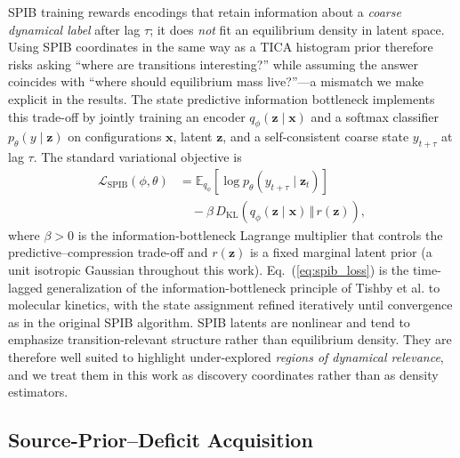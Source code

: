 \documentclass[journal=jctcce,manuscript=article,layout=twocolumn]{achemso}
\begin{document}
SPIB training rewards encodings that retain information about a \emph{coarse dynamical label} after lag $\tau$; it does \emph{not} fit an equilibrium density in latent space. Using SPIB coordinates in the same way as a TICA histogram prior therefore risks asking ``where are transitions interesting?'' while assuming the answer coincides with ``where should equilibrium mass live?''---a mismatch we make explicit in the results. The state predictive information bottleneck\cite{wang2021spib} implements this trade-off by jointly training an encoder $q_\phi(\mathbf{z}\mid\mathbf{x})$ and a softmax classifier $p_\theta(y\mid\mathbf{z})$ on configurations $\mathbf{x}$, latent $\mathbf{z}$, and a self-consistent coarse state $y_{t+\tau}$ at lag $\tau$. The standard variational objective is
\begin{equation}
\begin{split}
    \mathcal{L}_{\mathrm{SPIB}}(\phi,\theta) &=
    \mathbb{E}_{q_\phi}\!\left[\log p_\theta(y_{t+\tau}\mid \mathbf{z}_t)\right] \\
    &\quad - \beta\,D_{\mathrm{KL}}\!\left(q_\phi(\mathbf{z}\mid\mathbf{x})\,\Vert\,r(\mathbf{z})\right),
\end{split}
    \label{eq:spib_loss}
\end{equation}
where $\beta>0$ is the information-bottleneck Lagrange multiplier that controls the predictive--compression trade-off and $r(\mathbf{z})$ is a fixed marginal latent prior (a unit isotropic Gaussian throughout this work). Eq.~(\ref{eq:spib_loss}) is the time-lagged generalization of the information-bottleneck principle of Tishby et al.\cite{tishby2000information} to molecular kinetics, with the state assignment refined iteratively until convergence as in the original SPIB algorithm. SPIB latents are nonlinear and tend to emphasize transition-relevant structure rather than equilibrium density. They are therefore well suited to highlight under-explored \emph{regions of dynamical relevance}, and we treat them in this work as discovery coordinates rather than as density estimators.

\subsection{Source-Prior--Deficit Acquisition}
\label{sec:theory_score}
\end{document}
